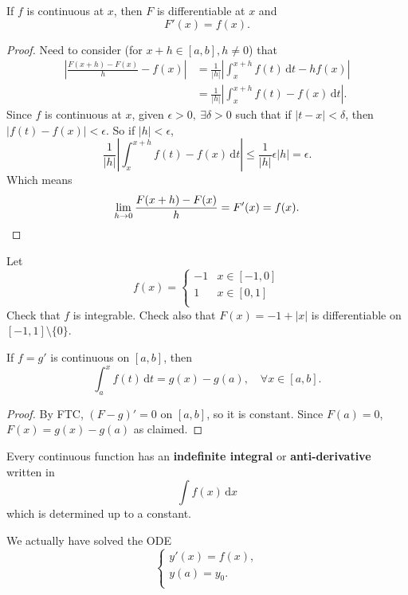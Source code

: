 \begin{theorem}[FTC]\label{thm:5.8}
    If $f$ is continuous at $x$, then $F$ is differentiable at $x$ and
    \[
        F'(x)=f(x).
    \] 
\end{theorem}
\begin{proof}
    Need to consider (for $ x+h\in [a,b],h\neq 0 $) that
    \begin{align*}
        \left| \frac{F(x+h)-F(x)}{h}-f(x) \right|&= \frac{1}{|h|}\left| \int_{x}^{x+h} f(t) \,\mathrm{d}t - h f(x) \right| \\ 
        &= \frac{1}{|h|} \left| \int_{x}^{x+h} f(t)-f(x) \,\mathrm{d}t \right| .
    \end{align*}
    Since $f$ is continuous at $x$, given $ \epsilon>0,\ \exists \delta>0  $ such that if $ |t-x|<\delta $, then $ |f(t)-f(x)|<\epsilon$. So if $ |h|<\epsilon $, 
    \[
        \frac{1}{|h|} \left| \int_{x}^{x+h} f(t)-f(x) \,\mathrm{d}t \right|\le \frac{1}{|h|} \epsilon |h| = \epsilon.
    \]
    Which means 
    \[
        \lim_{h \to 0} \frac{F(x+h)-F(x)}{h} = F'(x) = f(x).\qedhere
    \]
\end{proof}
\begin{example}
    Let 
    \[
        f(x) = \begin{cases}
        -1 &x\in [-1,0]\\
        1 &x\in [0,1]\\
        \end{cases} 
    \]
    Check that $f$ is integrable. Check also that $F(x)=-1+|x|$ is differentiable on $ [-1,1]\setminus \{0\} $.
\end{example}
\begin{corollary}
    If $f=g'$ is continuous on $[a,b]$, then 
    \[
        \int_{a}^{x} f(t) \,\mathrm{d}t = g(x)-g(a),\quad \forall x\in [a,b].
    \]
\end{corollary}
\begin{proof}
    By FTC, $(F-g)'=0$ on $ [a,b] $, so it is constant. Since $F(a)=0$, $ F(x)=g(x)-g(a) $ as claimed.
\end{proof}

\begin{note}
    Every continuous function has an \textbf{indefinite integral} or \textbf{anti-derivative} written in 
    \[
        \int f(x) \,\mathrm{d}x
    \]
    which is determined up to a constant.
\end{note}
\begin{remark}
    We actually have solved the ODE 
    \[
        \begin{cases}
         y'(x)=f(x),\\
         y(a)=y_0.\\
        \end{cases}
    \]
\end{remark}

